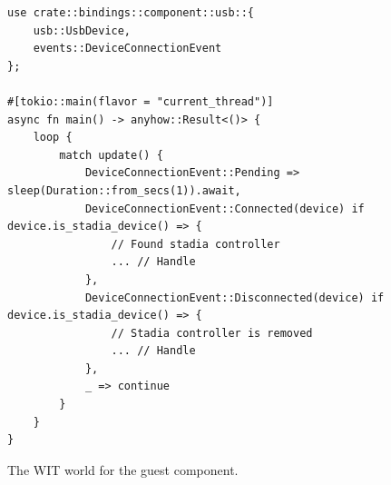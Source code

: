 \begin{code}
\begin{verbatim}
use crate::bindings::component::usb::{
	usb::UsbDevice, 
	events::DeviceConnectionEvent
};

#[tokio::main(flavor = "current_thread")]
async fn main() -> anyhow::Result<()> {
	loop {
		match update() {
			DeviceConnectionEvent::Pending => sleep(Duration::from_secs(1)).await,
			DeviceConnectionEvent::Connected(device) if device.is_stadia_device() => {
				// Found stadia controller
				... // Handle
			},
			DeviceConnectionEvent::Disconnected(device) if device.is_stadia_device() => {
				// Stadia controller is removed
				... // Handle
			},
			_ => continue
		}
	}
}
\end{verbatim} 
\caption{The \acrshort{WIT} world for the guest component.}
\label{code:calling_usb_api}
\end{code}

